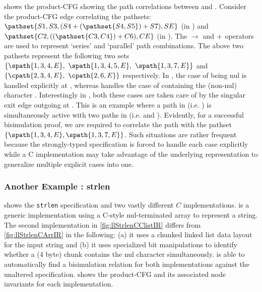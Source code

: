  shows the product-CFG showing the path correlations between \sprog{} and \cprog{}.
Consider the product-CFG edge  correlating the pathsets:
{\small $\pathset{S1,S3,(S4 \pathpar (\pathset{S4,S5}) \pathpar S7), SE}$} (in \sprog{}) and
{\small $\pathset{C2,((\pathset{C3,C4}) \pathpar C6),CE}$} (in \cprog{}).
The $\rightarrow$ and $+$ operators are used to represent `series' and `parallel' path combinations.
The above two pathsets represent the following two sets
{\small $\{ \spath{1,3,4,E},\ \spath{1,3,4,5,E},\ \spath{1,3,7,E} \}$} and
{\small $\{ \cpath{2,3,4,E},\ \cpath{2,6,E} \}$} respectively.
In \sprog{}, the case of  being nul is handled explicitly at , whereas
 handles the case of  containing the (non-nul) character .
Interestingly in \cprog{}, both these cases are taken care of by the singular exit edge outgoing at .
This is an example where a path in \cprog{} (i.e. ) is simultaneously active with
two paths in \sprog{} (i.e.  and ).
Evidently, for a successful bisimulation proof, we are required to correlate the \cprog{} path
 with the \sprog{} pathset $\{ \spath{1,3,4,E}, \spath{1,3,7,E} \}$.
Such situations are rather frequent because the strongly-typed specification is forced to handle
each case explicitly while a C implementation may take advantage of the
underlying representation to generalize multiple explicit cases into one.

\subsubsection{Another Example : strlen}
 shows the {\tt strlen} specification and two vastly
different $C$ implementations.  is a generic implementation
using a C-style nul-terminated array to represent a string.
The second implementation in \cref{fig:llStrlenCClistIR} differs from \cref{fig:llStrlenCArrIR}
in the following: (a) it uses a chunked linked list data layout for the input string
and (b) it uses specialized bit manipulations to identify whether a (4 byte) chunk contains the nul character simultaneously.
\toolName{} is able to automatically find a bisimulation relation
for both implementations against the unaltered specification.
 shows the product-CFG and its associated node invariants for each implementation.


